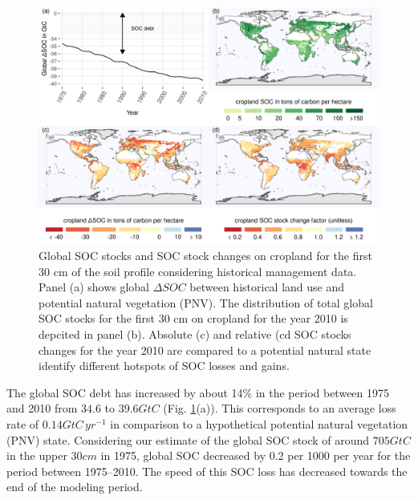 \documentclass[gc, manuscript]{copernicus}
\begin{document}
\begin{figure}[h]
\includegraphics[width=18cm]{../ResultNotebooks/Output/Images/4panelfigure} \caption{Global SOC stocks and SOC stock changes on cropland for the first 30 cm of the soil profile considering historical management data. Panel (a) shows global $\Delta SOC$ between historical land use and potential natural vegetation (PNV). The distribution of total global SOC stocks for the first 30 cm on cropland for the year 2010 is depcited in panel (b). Absolute (c) and relative (cd SOC stocks changes for the year 2010 are compared to a potential natural state identify different hotspots of SOC losses and gains.}\label{fig:SOCmaps}
\end{figure}

The global SOC debt has increased by about 14\% in the period between 1975 and 2010 from \(34.6\) to \(39.6\unit{GtC}\) (Fig. \ref{fig:SOCmaps}(a)). This corresponds to an average loss rate of \(0.14\unit{GtC\,yr^{-1}}\) in comparison to a hypothetical potential natural vegetation (PNV) state. Considering our estimate of the global SOC stock of around \(705\unit{GtC}\) in the upper \(30\unit{cm}\) in 1975, global SOC decreased by 0.2 per 1000 per year for the period between 1975--2010. The speed of this SOC loss has decreased towards the end of the modeling period.
\end{document}
